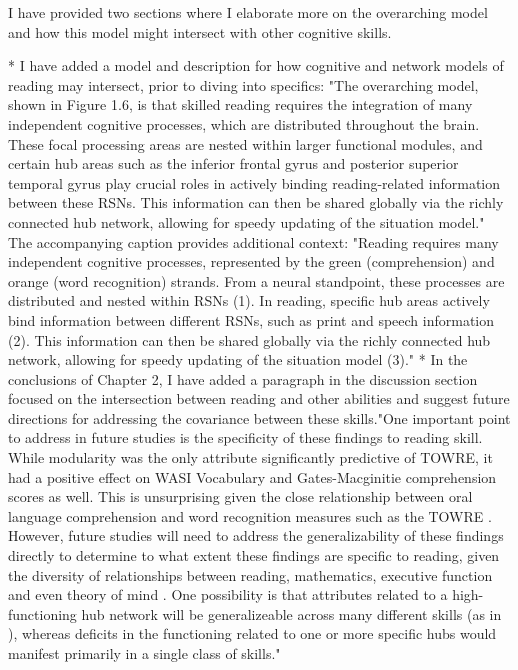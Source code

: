 {I have provided two sections where I elaborate more on the overarching model and how this model might intersect with other cognitive skills. 

* I have added a model and description for how cognitive and network models of reading may intersect, prior to diving into specifics: "The overarching model, shown in Figure 1.6, is that skilled reading requires the integration of many independent cognitive processes, which are distributed throughout the brain. These focal processing areas are nested within larger functional modules, and certain hub areas such as the inferior frontal gyrus and posterior superior temporal gyrus play crucial roles in actively binding reading-related information between these RSNs. This information can then be shared globally via the richly connected hub network, allowing for speedy updating of the situation model." The accompanying caption provides additional context: "Reading requires many independent cognitive processes, represented by the green (comprehension) and orange (word recognition) strands. From a neural standpoint, these processes are distributed and nested within RSNs (1). In reading, specific hub areas actively bind information between different RSNs, such as print and speech information (2). This information can then be shared globally via the richly connected hub network, allowing for speedy updating of the situation model (3)."
* In the conclusions of Chapter 2, I have added a paragraph in the discussion section focused on the intersection between reading and other abilities and suggest future directions for addressing the covariance between these skills."One important point to address in future studies is the specificity of these findings to reading skill. While modularity was the only attribute significantly predictive of TOWRE, it had a positive effect on WASI Vocabulary and Gates-Macginitie comprehension scores as well. This is unsurprising given the close relationship between oral language comprehension and word recognition measures such as the TOWRE \citep{Storch2002}. However, future studies will need to address the generalizability of these findings directly to determine to what extent these findings are specific to reading, given the diversity of relationships between reading, mathematics, executive function and even theory of mind \citep{Cantin2016}. One possibility is that attributes related to a high-functioning hub network will be generalizeable across many different skills (as in \cite{Bertolero2018}), whereas deficits in the functioning related to one or more specific hubs would manifest primarily in a single class of skills."

}
